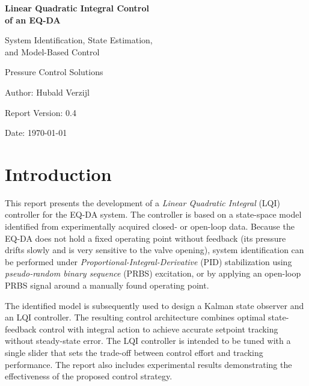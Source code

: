\documentclass[12pt,a4paper]{article}
\newcommand{\CompanyName}{Pressure Control Solutions}
\newcommand{\ReportTitle}{Linear Quadratic Integral Control\\of an EQ-DA}
\newcommand{\ReportSubTitle}{System Identification, State Estimation,\\and Model-Based Control}
\newcommand{\AuthorName}{Hubald Verzijl}
\newcommand{\VersionNumber}{0.4}
\newcommand{\ReportDate}{\today}
\begin{document}
\begin{titlepage}
    \thispagestyle{fancy}
    \fancyfoot{} %
    \centering
    \vspace*{2cm}
    {\Huge \bfseries \ReportTitle \par}
    \vspace{0.5cm}
    {\Large \ReportSubTitle \par}
    \vspace{2cm}
    \vspace{2cm}
    {\Large \CompanyName \par}
    \vspace{0.25cm}
    {\small Author: \AuthorName \par}
    \vspace{0.25cm}
    {\small Report Version: \VersionNumber \par}
    \vspace{0.25cm}
    {\small Date: \ReportDate \par}
    \vfill
\end{titlepage}

\section*{Introduction}
This report presents the development of a \textit{Linear Quadratic Integral} (LQI) controller for the EQ-DA system. The controller is based on a state-space model identified from experimentally acquired closed- or open-loop data. Because the EQ-DA does not hold a fixed operating point without feedback (its pressure drifts slowly and is very sensitive to the valve opening), system identification can be performed under \textit{Proportional-Integral-Derivative} (PID) stabilization using \textit{pseudo-random binary sequence} (PRBS) excitation, or by applying an open-loop PRBS signal around a manually found operating point.

The identified model is subsequently used to design a Kalman state observer and an LQI controller. The resulting control architecture combines optimal state-feedback control with integral action to achieve accurate setpoint tracking without steady-state error. The LQI controller is intended to be tuned with a single slider that sets the trade-off between control effort and tracking performance. The report also includes experimental results demonstrating the effectiveness of the proposed control strategy.
\end{document}
